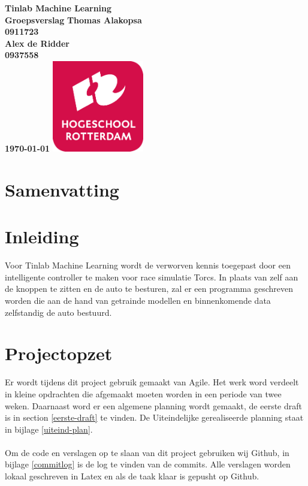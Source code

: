\documentclass{article}
\begin{document}
\sffamily
\begin{titlepage}
  \centering
    \vfill
    {\bfseries\Huge
      Tinlab Machine Learning \\
      Groepsverslag
        \vskip2cm
      }
      {\bfseries\Large
      	Thomas Alakopsa\\
      	{ \bfseries\normalsize
      	0911723\\
      	}
      }
      {\bfseries\Large
      	Alex de Ridder\\
      	{ \bfseries\normalsize
      	0937558\\
      	}
      }
      {
        \bfseries\normalsize
        \vskip2cm
        \today
    }    
    \vfill
    \includegraphics[width=4cm]{logohr.png}
    \vfill
    \vfill
\end{titlepage}
\newpage

\section{Samenvatting}


\section{Inleiding}
Voor Tinlab Machine Learning wordt de verworven kennis toegepast door een intelligente controller te maken voor race simulatie Torcs. In plaats van zelf aan de knoppen te zitten en de auto te besturen, zal er een programma geschreven worden die aan de hand van getrainde modellen en binnenkomende data zelfstandig de auto bestuurd. 


\section{Projectopzet}
Er wordt tijdens dit project gebruik gemaakt van Agile. Het werk word verdeelt in kleine opdrachten die afgemaakt moeten worden in een periode van twee weken. Daarnaast word er een algemene planning wordt gemaakt, de eerste draft is in section \ref{eerste-draft} te vinden. De Uiteindelijke gerealiseerde planning staat in bijlage \ref{uiteind-plan}.\\\\
Om de code en verslagen op te slaan van dit project gebruiken wij Github, in bijlage \ref{commitlog} is de log te vinden van de commits. Alle verslagen worden lokaal geschreven in Latex en als de taak klaar is gepusht op Github.
\end{document}
